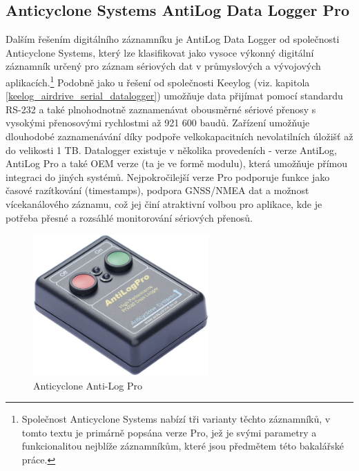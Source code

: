 \subsection{Anticyclone Systems AntiLog Data Logger Pro}
\label{anticyclone_systems_antilog_data_logger}
Dalším řešením digitálního záznamníku je AntiLog Data Logger od společnosti Anticyclone Systems, který lze klasifikovat jako vysoce výkonný digitální záznamník určený pro záznam sériových dat v průmyslových a vývojových aplikacích.\footnote{Společnost Anticyclone Systems nabízí tři varianty těchto záznamníků, v tomto textu je primárně popsána verze Pro, jež je svými parametry a funkcionalitou nejblíže záznamníkům, které jsou předmětem této bakalářské práce.} Podobně jako u řešení od společnosti Keeylog (viz. kapitola \ref{keelog_airdrive_serial_datalogger}) umožňuje data přijímat pomocí standardu RS-232 a také plnohodnotně zaznamenávat obousměrné sériové přenosy s vysokými přenosovými rychlostmi až 921 600 baudů. Zařízení umožňuje dlouhodobé zaznamenávání díky podpoře velkokapacitních nevolatilních úložišť až do velikosti 1 TB. Datalogger existuje v několika provedeních - verze AntiLog, AntiLog Pro a také OEM verze (ta je ve formě modulu), která umožňuje přímou integraci do jiných systémů. Nejpokročilejší verze Pro podporuje funkce jako časové razítkování (timestamps), podpora GNSS/NMEA dat a možnost vícekanálového záznamu, což jej činí atraktivní volbou pro aplikace, kde je potřeba přesné a rozsáhlé monitorování sériových přenosů. \cite{anticyclone_systems_antilog_pro}

\begin{figure}[h]
    \centering
    \includegraphics[width=0.6\textwidth]{obrazky-figures/antilogpro.png}
    
    \caption{Anticyclone Anti-Log Pro \cite{anticyclone_systems_antilog_pro_price}}
    \label{fig:antilog-pro}
\end{figure}

